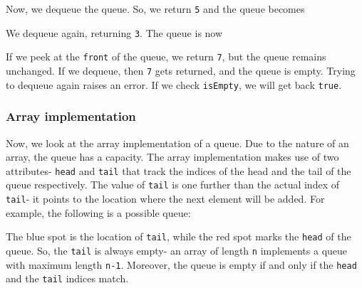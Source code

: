 \documentclass[a4paper, openany]{memoir}
\begin{document}
\begin{center}
\end{center}
Now, we dequeue the queue. So, we return \texttt{5} and the queue becomes
\begin{center}
\end{center}
We dequeue again, returning \texttt{3}. The queue is now
\begin{center}
\end{center}
If we peek at the \texttt{front} of the queue, we return \texttt{7}, but the queue remains unchanged. If we dequeue, then \texttt{7} gets returned, and the queue is empty. Trying to dequeue again raises an error. If we check \texttt{isEmpty}, we will get back \texttt{true}.

\subsubsection{Array implementation}
Now, we look at the array implementation of a queue. Due to the nature of an array, the queue has a capacity. The array implementation makes use of two attributes- \texttt{head} and \texttt{tail} that track the indices of the head and the tail of the queue respectively. The value of \texttt{tail} is one further than the actual index of \texttt{tail}- it points to the location where the next element will be added. For example, the following is a possible queue:
\begin{center}
\end{center}
The blue spot is the location of \texttt{tail}, while the red spot marks the \texttt{head} of the queue. So, the \texttt{tail} is always empty- an array of length \texttt{n} implements a queue with maximum length \texttt{n-1}. Moreover, the queue is empty if and only if the \texttt{head} and the \texttt{tail} indices match.
\end{document}
